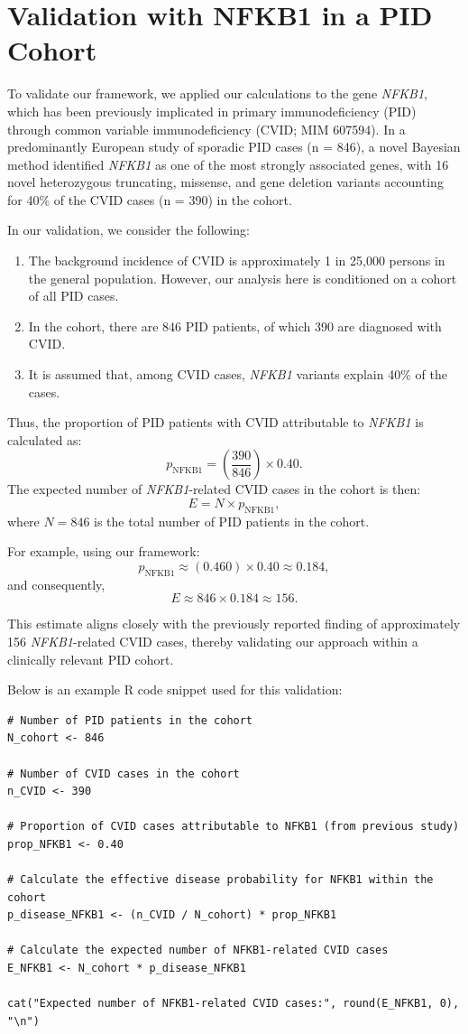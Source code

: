 \documentclass[a4paper,12pt]{article}
\begin{document}
\section{Validation with NFKB1 in a PID Cohort}

To validate our framework, we applied our calculations to the gene \textit{NFKB1}, which has been previously implicated in primary immunodeficiency (PID) through common variable immunodeficiency (CVID; MIM 607594). In a predominantly European study of sporadic PID cases (n = 846), a novel Bayesian method identified \textit{NFKB1} as one of the most strongly associated genes, with 16 novel heterozygous truncating, missense, and gene deletion variants accounting for 40\% of the CVID cases (n = 390) in the cohort.

In our validation, we consider the following:
\begin{enumerate}
    \item The background incidence of CVID is approximately 1 in 25,000 persons in the general population. However, our analysis here is conditioned on a cohort of all PID cases.
    \item In the cohort, there are 846 PID patients, of which 390 are diagnosed with CVID.
    \item It is assumed that, among CVID cases, \textit{NFKB1} variants explain 40\% of the cases.
\end{enumerate}

Thus, the proportion of PID patients with CVID attributable to \textit{NFKB1} is calculated as:
\[
p_{\text{NFKB1}} = \left(\frac{390}{846}\right) \times 0.40.
\]
The expected number of \textit{NFKB1}-related CVID cases in the cohort is then:
\[
E = N \times p_{\text{NFKB1}},
\]
where \(N=846\) is the total number of PID patients in the cohort.

For example, using our framework:
\[
p_{\text{NFKB1}} \approx \left(0.460\right) \times 0.40 \approx 0.184,
\]
and consequently,
\[
E \approx 846 \times 0.184 \approx 156.
\]

This estimate aligns closely with the previously reported finding of approximately 156 \textit{NFKB1}-related CVID cases, thereby validating our approach within a clinically relevant PID cohort.

Below is an example R code snippet used for this validation:

\begin{verbatim}
# Number of PID patients in the cohort
N_cohort <- 846

# Number of CVID cases in the cohort
n_CVID <- 390

# Proportion of CVID cases attributable to NFKB1 (from previous study)
prop_NFKB1 <- 0.40

# Calculate the effective disease probability for NFKB1 within the cohort
p_disease_NFKB1 <- (n_CVID / N_cohort) * prop_NFKB1

# Calculate the expected number of NFKB1-related CVID cases
E_NFKB1 <- N_cohort * p_disease_NFKB1

cat("Expected number of NFKB1-related CVID cases:", round(E_NFKB1, 0), "\n")
\end{verbatim}
\end{document}
